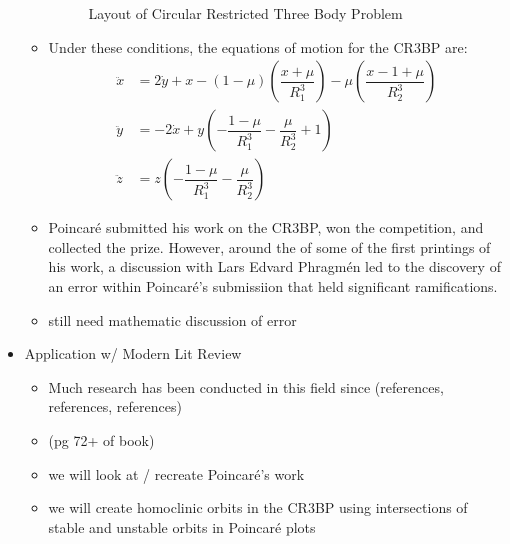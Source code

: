 \documentclass{article}
\begin{document}
\begin{itemize}
\begin{itemize}
\begin{figure}
	  	\caption{Layout of Circular Restricted Three Body Problem \cite{KoonLoMarsdenRoss2011}}
		\label{fig:CR3BP}
	  	\end{figure}
		\item Under these conditions, the equations of motion for the CR3BP are:
	  	\begin{align}
	  	\ddot{x} &=  2\dot{y} + x - (1-\mu)\left(\dfrac{x+\mu}{R_1^3}\right) - \mu\left(\dfrac{x-1+\mu}{R_2^3}\right)\\
		\ddot{y} &= - 2\dot{x} + y\left(-\dfrac{1-\mu}{R_1^3} - \dfrac{\mu}{R_2^3} + 1\right) \\
		\ddot{z} &= z\left(-\dfrac{1 - \mu}{R_1^3} - \dfrac{\mu}{R_2^3}\right)
		\end{align}
	  	\item Poincaré submitted his work on the CR3BP, won the competition, and collected the prize. However, around the of some of the first printings of his work, a discussion with Lars Edvard Phragmén led to the discovery of an error within Poincaré's submissiion that held significant ramifications.
	  	\item \color{red} still need mathematic discussion of error \color{black}

	  \end{itemize}
	\item Application w/ Modern Lit Review
	  \begin{itemize}
	  	\item \color{red}Much research has been conducted in this field since (references, references, references)\color{black}
	  	\item (pg 72+ of book)
	  	\item we will look at / recreate Poincaré's work
	  	\item we will create homoclinic orbits in the CR3BP using intersections of stable and unstable orbits in Poincaré plots
	  \end{itemize}
\end{itemize}



\end{document}
